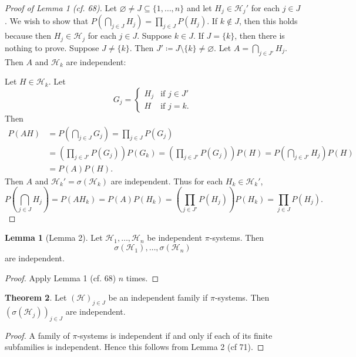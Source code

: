 \documentclass{article}
\theoremstyle{definition}
\newtheorem{theorem}{Theorem}
\newtheorem{lemma}[theorem]{Lemma}
\begin{document}
\begin{proof}[Proof of Lemma 1 (cf. 68)]
    Let $\varnothing \neq J \subseteq \{1, \dots, n\}$ and let $H_j \in \mathscr{H}_j'$ for each $j \in J$. We wish to show that $P\left(\bigcap_{j \in J} H_j\right) = \prod_{j \in J} P(H_j)$. If $k \notin J$, then this holds because then $H_j \in \mathscr{H}_j$ for each $j \in J$.
    Suppose $k \in J$. If $J = \{k\}$, then there is nothing to prove. Suppose $J \neq \{k\}$. Then $J' \coloneqq J \setminus \{k\} \neq \varnothing$.
    Let $A = \bigcap_{j \in J'} H_j$. Then $A$ and $\mathscr{H}_k$ are independent:
    
    Let $H \in \mathscr{H}_k$. Let
    \[G_j = \begin{cases} H_j &\text{if } j \in J' \\ H &\text{if } j = k.\end{cases}\]
    Then
    \begin{equation*} \begin{split}
        P(AH) &= P\left(\bigcap_{j \in J} G_j\right) = \prod_{j \in J} P(G_j) \\
        &= \left(\prod_{j \in J'}P(G_j)\right)P(G_k) = \left(\prod_{j \in J'}P(G_j)\right)P(H) = P\left( \bigcap_{j \in J'} H_j \right)P(H) \\
        &= P(A)P(H).
    \end{split} \end{equation*}
    Then $A$ and $\mathscr{H}_k' = \sigma(\mathscr{H}_k)$ are independent. Thus for each $H_k \in \mathscr{H}_k'$,
    \[
        P\left( \bigcap_{j \in J} H_j \right) = P(AH_k) = P(A)P(H_k) = \left(\prod_{j \in J'} P(H_j)\right)P(H_k) = \prod_{j \in J} P(H_j).
    \]
\end{proof}

\begin{lemma}[Lemma 2]
    Let $\mathscr{H}_1, \dots, \mathscr{H}_n$ be independent $\pi$-systems. Then
    \[
        \sigma(\mathscr{H}_1), \dots, \sigma(\mathscr{H}_n)
    \]
    are independent.
\end{lemma}
\begin{proof}
    Apply Lemma 1 (cf. 68) $n$ times.
\end{proof}

\begin{theorem}
Let $(\mathscr{H})_{j \in J}$ be an independent family if $\pi$-systems. Then $(\sigma(\mathscr{H}_j))_{j \in J}$ are independent.
\end{theorem}
\begin{proof}
    A family of $\pi$-systems is independent if and only if each of its finite subfamilies is independent. Hence this follows from Lemma 2 (cf 71).
\end{proof}
\end{document}
